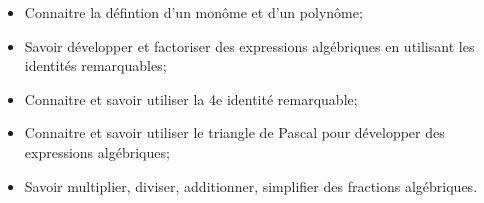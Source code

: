 \begin{acquis}
\begin{itemize}
\item Connaitre la défintion d'un monôme et d'un polynôme;
\item Savoir développer et factoriser des expressions algébriques en utilisant les identités remarquables;
\item Connaitre et savoir utiliser la 4e identité remarquable;
\item Connaitre et savoir utiliser le triangle de Pascal pour développer des expressions algébriques;
\item Savoir multiplier, diviser, additionner, simplifier des fractions algébriques.
\end{itemize}
\end{acquis}



